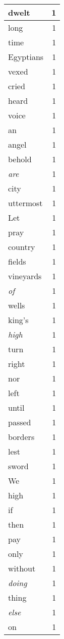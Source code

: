 \begin{center}
\begin{longtable}{l|r}
dwelt & 1 \\ \hline
long & 1 \\ \hline
time & 1 \\ \hline
Egyptians & 1 \\ \hline
vexed & 1 \\ \hline
cried & 1 \\ \hline
heard & 1 \\ \hline
voice & 1 \\ \hline
an & 1 \\ \hline
angel & 1 \\ \hline
behold & 1 \\ \hline
\emph{are} & 1 \\ \hline
city & 1 \\ \hline
uttermost & 1 \\ \hline
Let & 1 \\ \hline
pray & 1 \\ \hline
country & 1 \\ \hline
fields & 1 \\ \hline
vineyards & 1 \\ \hline
\emph{of} & 1 \\ \hline
wells & 1 \\ \hline
king's & 1 \\ \hline
\emph{high} & 1 \\ \hline
turn & 1 \\ \hline
right & 1 \\ \hline
nor & 1 \\ \hline
left & 1 \\ \hline
until & 1 \\ \hline
passed & 1 \\ \hline
borders & 1 \\ \hline
lest & 1 \\ \hline
sword & 1 \\ \hline
We & 1 \\ \hline
high & 1 \\ \hline
if & 1 \\ \hline
then & 1 \\ \hline
pay & 1 \\ \hline
only & 1 \\ \hline
without & 1 \\ \hline
\emph{doing} & 1 \\ \hline
thing & 1 \\ \hline
\emph{else} & 1 \\ \hline
on & 1 \\ \hline

\end{longtable}
\end{center}
